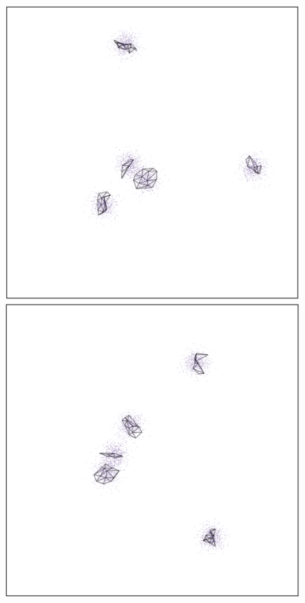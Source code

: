 \documentclass[
  12pt]{article}
\begin{document}
\begin{figure}[H]

\begin{minipage}{0.33\linewidth}
\includegraphics{figures/five_gau_clusters/sc_phate_1.png}\end{minipage}%
%
\begin{minipage}{0.33\linewidth}
\includegraphics{figures/five_gau_clusters/sc_phate_2.png}\end{minipage}%

\end{figure}
\end{document}
